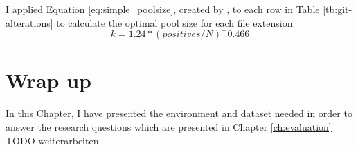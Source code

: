 I applied Equation \ref{eq:simple_poolsize}, created by \cite{regen2020simple}, to each row in Table \ref{tb:git-alterations} to calculate the optimal pool size for each file extension.
\begin{equation}\label{eq:simple_poolsize}
    k = 1.24* (positives/N)^-0.466
\end{equation}

\section{Wrap up}
In this Chapter, I have presented the environment and dataset needed in order to answer the research questions which are presented in Chapter \ref{ch:evaluation}
TODO weiterarbeiten